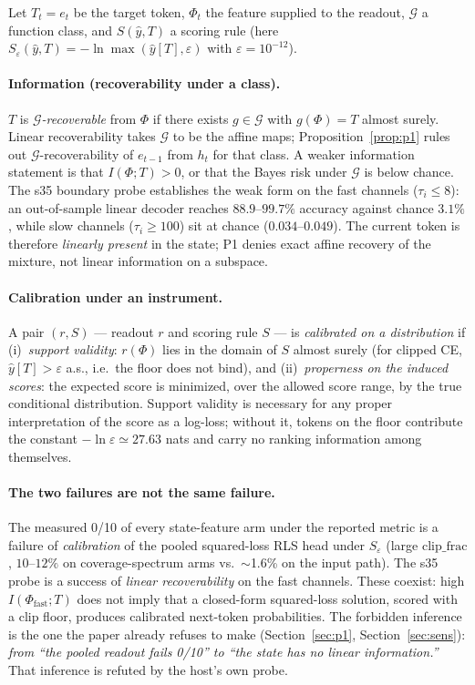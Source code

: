 \documentclass[preprint,12pt]{elsarticle}
\begin{document}
Let $T_t=e_t$ be the target token, $\Phi_t$ the feature supplied to
the readout, $\mathcal{G}$ a function class, and $S(\hat y, T)$ a
scoring rule (here $S_\varepsilon(\hat y,T)=-\ln\max(\hat y[T],\varepsilon)$
with $\varepsilon=10^{-12}$).

\paragraph{Information (recoverability under a class).}
$T$ is \emph{$\mathcal{G}$-recoverable} from $\Phi$ if there exists
$g\in\mathcal{G}$ with $g(\Phi)=T$ almost surely. Linear recoverability
takes $\mathcal{G}$ to be the affine maps; Proposition~\ref{prop:p1}
rules out $\mathcal{G}$-recoverability of $e_{t-1}$ from $h_t$ for
that class. A weaker information statement is that $I(\Phi;T)>0$, or
that the Bayes risk under $\mathcal{G}$ is below chance. The s35
boundary probe establishes the weak form on the fast channels
($\tau_i\le 8$): an out-of-sample linear decoder reaches
$88.9$--$99.7\%$ accuracy against chance $3.1\%$, while slow channels
($\tau_i\ge 100$) sit at chance ($0.034$--$0.049$). The current token
is therefore \emph{linearly present} in the state; P1 denies exact
affine recovery of the mixture, not linear information on a subspace.

\paragraph{Calibration under an instrument.}
A pair $(r,S)$ --- readout $r$ and scoring rule $S$ --- is
\emph{calibrated on a distribution} if (i)~\emph{support validity}:
$r(\Phi)$ lies in the domain of $S$ almost surely (for clipped CE,
$\hat y[T]>\varepsilon$ a.s., i.e.\ the floor does not bind), and
(ii)~\emph{properness on the induced scores}: the expected score is
minimized, over the allowed score range, by the true conditional
distribution. Support validity is necessary for any proper
interpretation of the score as a log-loss; without it, tokens on the
floor contribute the constant $-\ln\varepsilon\simeq 27.63$ nats and
carry no ranking information among themselves.

\paragraph{The two failures are not the same failure.}
The measured 0/10 of every state-feature arm under the reported metric
is a failure of \emph{calibration} of the pooled squared-loss RLS head
under $S_\varepsilon$ (large $\mathrm{clip\_frac}$, $10$--$12\%$ on
coverage-spectrum arms vs.\ $\sim$1.6\% on the input path). The s35
probe is a success of \emph{linear recoverability} on the fast
channels. These coexist: high $I(\Phi_{\mathrm{fast}}; T)$ does not
imply that a closed-form squared-loss solution, scored with a clip
floor, produces calibrated next-token probabilities. The forbidden
inference is the one the paper already refuses to make
(Section~\ref{sec:p1}, Section~\ref{sec:sens}):
\emph{from ``the pooled readout fails 0/10'' to ``the state has no
linear information.''} That inference is refuted by the host's own
probe.
\end{document}
